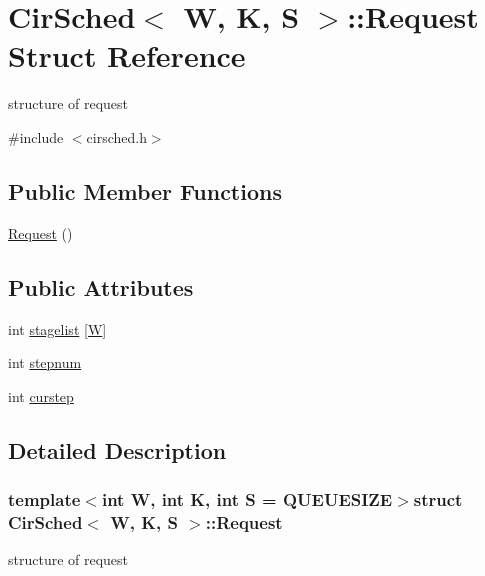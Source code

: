 \hypertarget{structCirSched_1_1Request}{\section{Cir\-Sched$<$ W, K, S $>$\-:\-:Request Struct Reference}
\label{structCirSched_1_1Request}
}


structure of request  




{\ttfamily \#include $<$cirsched.\-h$>$}

\subsection*{Public Member Functions}
\begin{DoxyCompactItemize}
\item 
\hyperlink{structCirSched_1_1Request_a4e480d4d0afc4f3072ff1088ab55035c}{Request} ()
\end{DoxyCompactItemize}
\subsection*{Public Attributes}
\begin{DoxyCompactItemize}
\item 
int \hyperlink{structCirSched_1_1Request_a5a2d64a469ba6ef8dfab9f492fe8fc41}{stagelist} \mbox{[}\hyperlink{test__u128_8cpp_ab21b528bc38899d04d3a7053e52fb797}{W}\mbox{]}
\item 
int \hyperlink{structCirSched_1_1Request_a51322546208ac56de4984c79d5227767}{stepnum}
\item 
int \hyperlink{structCirSched_1_1Request_a30403a88a167dcce27c18ecc24c40f2e}{curstep}
\end{DoxyCompactItemize}


\subsection{Detailed Description}
\subsubsection*{template$<$int W, int K, int S = Q\-U\-E\-U\-E\-S\-I\-Z\-E$>$struct Cir\-Sched$<$ W, K, S $>$\-::\-Request}

structure of request 

